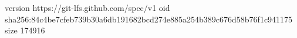 version https://git-lfs.github.com/spec/v1
oid sha256:84c4be7cfeb739b30a6db191682bcd274e885a254b389c676d58b76f1c941175
size 174916
